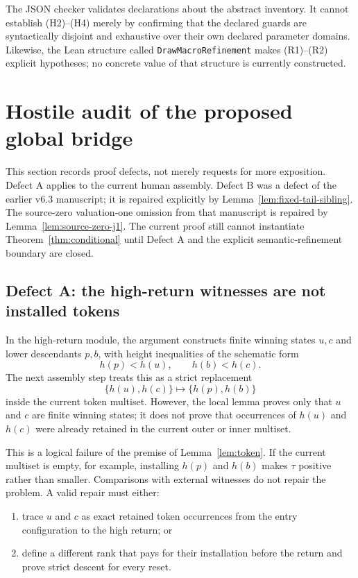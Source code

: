 \documentclass[11pt]{article}
\theoremstyle{definition}
\begin{document}
The JSON checker validates declarations about the abstract inventory.  It
cannot establish (H2)--(H4) merely by confirming that the declared guards are
syntactically disjoint and exhaustive over their own declared parameter
domains.  Likewise, the Lean structure called
\texttt{DrawMacroRefinement} makes (R1)--(R2) explicit hypotheses; no concrete
value of that structure is currently constructed.

\section{Hostile audit of the proposed global bridge}\label{sec:audit}

This section records proof defects, not merely requests for more exposition.
Defect A applies to the current human assembly.  Defect B was a defect of the
earlier v6.3 manuscript; it is repaired explicitly by
Lemma~\ref{lem:fixed-tail-sibling}.  The source-zero valuation-one omission
from that manuscript is repaired by Lemma~\ref{lem:source-zero-j1}.  The
current proof still cannot instantiate Theorem~\ref{thm:conditional} until
Defect A and the explicit semantic-refinement boundary are closed.

\subsection{Defect A: the high-return witnesses are not installed tokens}

In the high-return module, the argument constructs finite winning states
$u,c$ and lower descendants $p,b$, with height inequalities of the schematic
form
\[
  h(p)<h(u),\qquad h(b)<h(c).
\]
The next assembly step treats this as a strict replacement
\[
  \{h(u),h(c)\}\longmapsto\{h(p),h(b)\}
\]
inside the current token multiset.  However, the local lemma proves only that
$u$ and $c$ are finite winning states; it does not prove that occurrences of
$h(u)$ and $h(c)$ were already retained in the current outer or inner
multiset.

This is a logical failure of the premise of Lemma~\ref{lem:token}.  If the
current multiset is empty, for example, installing $h(p)$ and $h(b)$ makes
$\tau$ positive rather than smaller.  Comparisons with external witnesses do
not repair the problem.  A valid repair must either:

\begin{enumerate}
\item[(a)] trace $u$ and $c$ as exact retained token occurrences from the entry
      configuration to the high return; or
\item[(b)] define a different rank that pays for their installation before the
      return and prove strict descent for every reset.
\end{enumerate}
\end{document}
